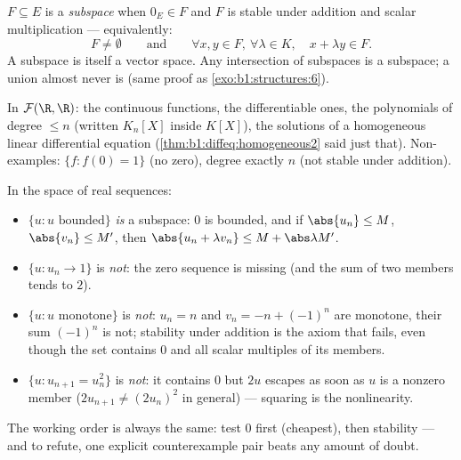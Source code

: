 \begin{definition}[Subspace]\label{def:b1:vspaces:subspace}
$F \subseteq E$ is a \emph{subspace} when $0_E \in
F$ and $F$ is stable under addition and scalar multiplication ---
equivalently:
\[
F \neq \emptyset
\qquad\text{and}\qquad
\forall x, y \in F,\ \forall \lambda \in K,\quad
x + \lambda y \in F .
\]
A subspace is itself a vector space. Any intersection of subspaces
is a subspace; a union almost never is (same proof as
\cref{exo:b1:structures:6}).
\end{definition}

\begin{example}\label{ex:b1:vspaces:subspaces}
In $\mathcal{F}(\R, \R)$: the continuous functions, the
differentiable ones, the polynomials of degree $\leq n$ (written
$K_n[X]$ inside $K[X]$), the solutions of a homogeneous linear
differential equation (\cref{thm:b1:diffeq:homogeneous2} said just
that). Non-examples: $\{f : f(0) = 1\}$ (no zero), degree exactly
$n$ (not stable under addition).
\end{example}

\begin{example}
\label{ex:b1:vspaces:subspaceornot}
In the space of real sequences:
\begin{itemize}
  \item $\{u : u \text{ bounded}\}$ \emph{is} a subspace: $0$ is
        bounded, and if $\abs{u_n} \leq M$, $\abs{v_n} \leq M'$,
        then $\abs{u_n + \lambda v_n} \leq M + \abs\lambda M'$.
  \item $\{u : u_n \to 1\}$ is \emph{not}: the zero sequence is
        missing (and the sum of two members tends to $2$).
  \item $\{u : u \text{ monotone}\}$ is \emph{not}: $u_n = n$
        and $v_n = -n + (-1)^n$ are monotone, their sum
        $(-1)^n$ is not; stability under addition is the axiom
        that fails, even though the set contains $0$ and all
        scalar multiples of its members.
  \item $\{u : u_{n+1} = u_n^2\}$ is \emph{not}: it contains $0$
        but $2u$ escapes as soon as $u$ is a nonzero member
        ($2u_{n+1} \neq (2u_n)^2$ in general) --- squaring is
        the nonlinearity.
\end{itemize}
The working order is always the same: test $0$ first (cheapest),
then stability --- and to refute, one explicit counterexample
pair beats any amount of doubt.
\end{example}

